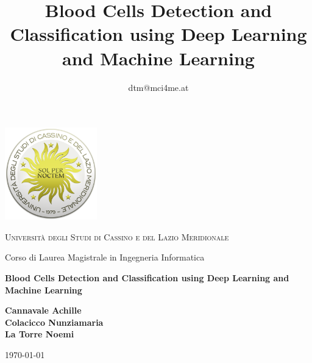 \documentclass[minted, draw]{../tex/hebdomon}
\begin{document}
\title{Blood Cells Detection and Classification using Deep Learning and Machine Learning}

\date{dtm@mci4me.at}



\begin{titlepage}
    \centering
	\includegraphics[width=4cm]{figures/logo.png}\par\vspace{1cm}


    {\scshape\LARGE Università degli Studi di Cassino e del Lazio Meridionale\par}
    \vspace{1cm}
    {\Large Corso di Laurea Magistrale in Ingegneria Informatica \par}

    \vspace{2cm}
    {\Huge\bfseries Blood Cells Detection and Classification using Deep Learning and Machine Learning\par}
    \vspace{1cm}

    \vfill

    \begin{flushleft}
    \textbf{Cannavale Achille} \\
    \textbf{Colacicco Nunziamaria} \\
    \textbf{La Torre Noemi} \\
    \end{flushleft}

    \vspace{1.5cm}

    {\large \today\par}
\end{titlepage}

\dominitoc
\tableofcontents
\newpage

\Chapter{}
\end{document}
